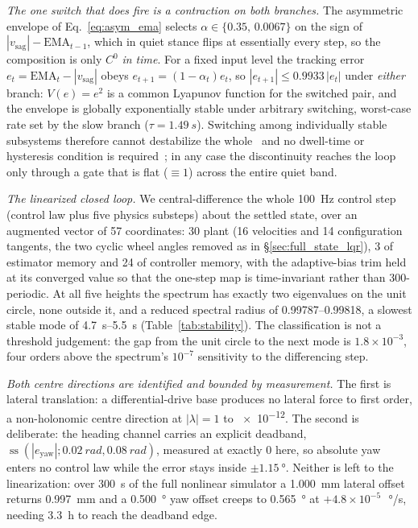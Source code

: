 \documentclass{jcd}
\begin{document}
\emph{The one switch that does fire is a contraction on both branches.} The
asymmetric envelope of Eq.~\eqref{eq:asym_ema} selects
$\alpha\in\{0.35,\,0.0067\}$ on the sign of $|v_{\text{sag}}|-\mathrm{EMA}_{t-1}$,
which in quiet stance flips at essentially every step, so the composition is only
$C^0$ \emph{in time}. For a fixed input level the tracking error
$e_t=\mathrm{EMA}_t-|v_{\text{sag}}|$ obeys $e_{t+1}=(1-\alpha_t)e_t$, so
$|e_{t+1}|\leq 0.9933\,|e_t|$ under \emph{either} branch: $V(e)=e^2$ is a common
Lyapunov function for the switched pair, and the envelope is globally
exponentially stable under arbitrary switching, worst-case rate set by the slow
branch ($\tau{=}\SI{1.49}{s}$). Switching among individually stable subsystems
therefore cannot destabilize the whole~\citep{liberzon2003switching} and no
dwell-time or hysteresis condition is required~\citep{hespanha2003hysteresis};
in any case the discontinuity reaches the loop only through a gate that is flat
($\equiv 1$) across the entire quiet band.

\emph{The linearized closed loop.} We central-difference the whole \SI{100}{Hz} control step (control law plus five physics substeps) about the settled state,
over an augmented vector of \num{57} coordinates: \num{30} plant (\num{16}
velocities and \num{14} configuration tangents, the two cyclic wheel angles
removed as in \S\ref{sec:full_state_lqr}), \num{3} of estimator memory and
\num{24} of controller memory, with the adaptive-bias trim held at its converged
value so that the one-step map is time-invariant rather than
\num{300}-periodic. At all five heights the spectrum has exactly two eigenvalues
on the unit circle, none outside it, and a reduced spectral radius of
\numrange{0.99787}{0.99818}, a slowest stable mode of \SIrange{4.7}{5.5}{s}
(Table~\ref{tab:stability}). The classification is not a threshold judgement:
the gap from the unit circle to the next mode is $1.8{\times}10^{-3}$, four orders
above the spectrum's $10^{-7}$ sensitivity to the differencing step.

\emph{Both centre directions are identified and bounded by measurement.} The
first is lateral translation: a differential-drive base produces no lateral force
to first order, a non-holonomic centre direction at $|\lambda|{=}1$ to \num{e-12}.
The second is deliberate: the heading channel carries an explicit deadband,
$\operatorname{ss}(|e_{\text{yaw}}|;\SI{0.02}{rad},\SI{0.08}{rad})$, measured at
exactly \num{0} here, so absolute yaw enters no control law while the error stays
inside $\pm\SI{1.15}{\degree}$. Neither is left to the linearization: over
\SI{300}{s} of the full nonlinear simulator a \SI{1.000}{mm} lateral offset
returns \SI{0.997}{mm} and a \SI{0.500}{\degree} yaw offset creeps to
\SI{0.565}{\degree} at $+4.8{\times}10^{-5}$\,\SI{}{\degree/s}, needing
\SI{3.3}{h} to reach the deadband edge.
\end{document}
